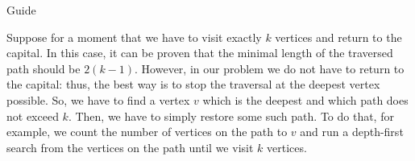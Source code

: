 \begin{tutorial}{Guide}

Suppose for a moment that we have to visit exactly $k$ vertices and return to the capital. In this case, it can be proven that the minimal length of the traversed path should be $2 (k - 1)$. However, in our problem we do not have to return to the capital: thus, the best way is to stop the traversal at the deepest vertex possible. So, we have to find a vertex $v$ which is the deepest and which path does not exceed $k$. Then, we have to simply restore some such path. To do that, for example, we count the number of vertices on the path to $v$ and run a depth-first search from the vertices on the path until we visit $k$ vertices.

\end{tutorial}
